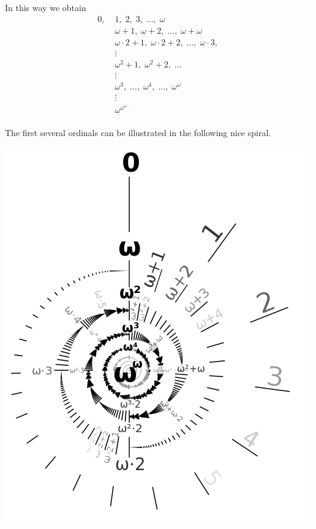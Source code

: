 In this way we obtain
\begin{align*}
	0,\; & 1,\; 2,\; 3,\; \dots,\; \omega \\
	& \omega+1,\; \omega+2,\; \dots,\; \omega+\omega \\
	& \omega \cdot 2 +1,\; \omega \cdot 2 +2,\; \dots,\; \omega \cdot 3,\; \\
	& \vdots \\
	& \omega^2 + 1,\; \omega^2+2,\; \dots \\
	& \vdots \\
	& \omega^3,\; \dots,\; \omega^4,\; \dots,\; \omega^\omega \\
	& \vdots \\
	& \omega^{\omega^{\omega^{\dots}}} \\
\end{align*}

The first several ordinals can be illustrated in the following nice spiral.
\begin{center}
	\includegraphics[scale=0.60]{media/500px-Omega-exp-omega-labeled.png}
\end{center}


